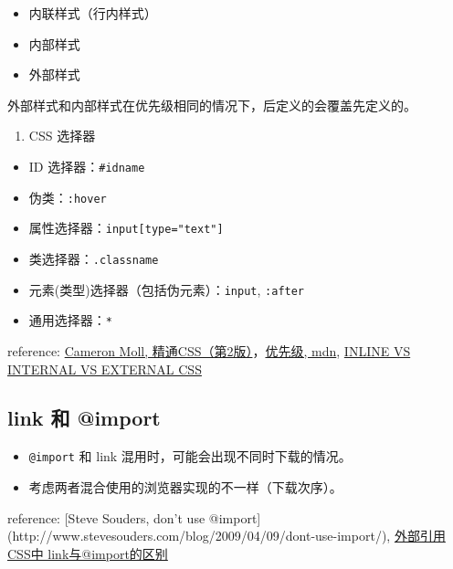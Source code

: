 \begin{itemize}
\tightlist
\item
  内联样式（行内样式）
\item
  内部样式
\item
  外部样式
\end{itemize}

外部样式和内部样式在优先级相同的情况下，后定义的会覆盖先定义的。

\begin{enumerate}
\def\labelenumi{\arabic{enumi}.}
\setcounter{enumi}{2}
\tightlist
\item
  CSS 选择器
\end{enumerate}

\begin{itemize}
\tightlist
\item
  ID 选择器：\lstinline!#idname!
\item
  伪类：\lstinline!:hover!
\item
  属性选择器：\lstinline!input[type="text"]!
\item
  类选择器：\lstinline!.classname!
\item
  元素(类型)选择器（包括伪元素）：\lstinline!input!, \lstinline!:after!
\item
  通用选择器：\lstinline!*!
\end{itemize}

reference: \href{http://book.douban.com/subject/4736167/}{Cameron Moll,
精通CSS（第2版）}，\href{https://developer.mozilla.org/zh-CN/docs/Web/CSS/Specificity}{优先级,
mdn},
\href{https://vineetgupta22.wordpress.com/2011/07/09/inline-vs-internal-vs-external-css/}{INLINE
VS INTERNAL VS EXTERNAL CSS}

\subsection{link 和 @import}\label{link-ux548c-import}

\begin{itemize}
\tightlist
\item
  \lstinline!@import! 和 link 混用时，可能会出现不同时下载的情况。
\item
  考虑两者混合使用的浏览器实现的不一样（下载次序）。
\end{itemize}

reference: {[}Steve Souders, don't use
@import{]}(http://www.stevesouders.com/blog/2009/04/09/dont-use-import/),
\href{http://www.dreamdu.com/blog/2007/05/11/css_link_import/}{外部引用CSS中
link与@import的区别}


